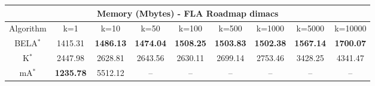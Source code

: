 \begin{tabular}{c|cccccccc}\toprule
\multicolumn{9}{c}{Memory (Mbytes) - FLA Roadmap dimacs}\\ \midrule
Algorithm & k=1 & k=10 & k=50 & k=100 & k=500 & k=1000 & k=5000 & k=10000 \\ \midrule
BELA$^*$ & 1415.31 & \textbf{1486.13} & \textbf{1474.04} & \textbf{1508.25} & \textbf{1503.83} & \textbf{1502.38} & \textbf{1567.14} & \textbf{1700.07} \\
K$^*$ & 2447.98 & 2628.81 & 2643.56 & 2630.11 & 2699.14 & 2753.46 & 3428.25 & 4341.47 \\
mA$^*$ & \textbf{1235.78} & 5512.12 & -- & -- & -- & -- & -- & -- \\ \bottomrule 
\end{tabular}

